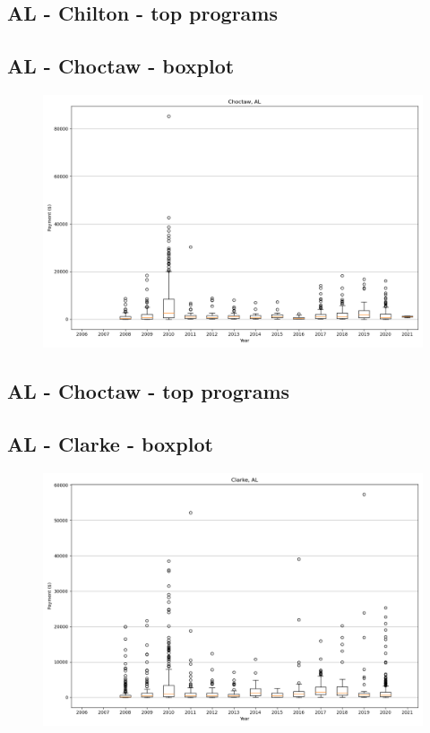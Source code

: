 \subsection*{AL - Chilton - top programs}

\newpage
\subsection*{AL - Choctaw - boxplot}
\begin{figure}[h]
\centering
\includegraphics[width=7in]{../output/boxplots/counties/Choctaw-AL_boxplot.png}
\end{figure}


\subsection*{AL - Choctaw - top programs}

\newpage
\subsection*{AL - Clarke - boxplot}
\begin{figure}[h]
\centering
\includegraphics[width=7in]{../output/boxplots/counties/Clarke-AL_boxplot.png}
\end{figure}


